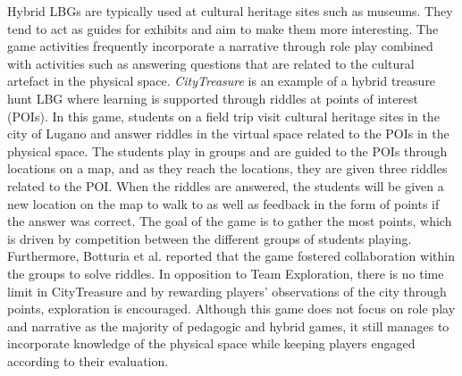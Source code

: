 Hybrid LBGs are typically used at cultural heritage sites such as museums\cite{LBG_Review}. They tend to act as guides for exhibits and aim to make them more interesting. The game activities frequently incorporate a narrative through role play combined with activities such as answering questions that are related to the cultural artefact in the physical space. \textit{CityTreasure}\cite{botturi2009city} is an example of a hybrid treasure hunt LBG where learning is supported through riddles at points of interest (POIs). In this game, students on a field trip visit cultural heritage sites in the city of Lugano and answer riddles in the virtual space related to the POIs in the physical space. The students play in groups and are guided to the POIs through locations on a map, and as they reach the locations, they are given three riddles related to the POI. When the riddles are answered, the students will be given a new location on the map to walk to as well as feedback in the form of points if the answer was correct. The goal of the game is to gather the most points, which is driven by competition between the different groups of students playing. Furthermore, Botturia et al.\cite{botturi2009city} reported that the game fostered collaboration within the groups to solve riddles. In opposition to Team Exploration, there is no time limit in CityTreasure and by rewarding players' observations of the city through points, exploration is encouraged. Although this game does not focus on role play and narrative as the majority of pedagogic and hybrid games, it still manages to incorporate knowledge of the physical space while keeping players engaged according to their evaluation.



